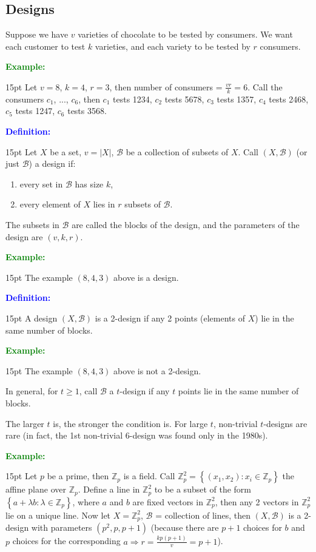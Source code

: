 \documentclass[12pt]{article}
\newcommand{\noparskip}{\vspace{-\parskip}}
\newenvironment{points}
	{\begin{enumerate}[label = (\arabic*)]}
	{\end{enumerate}}
\newenvironment{dent}
	{\begin{adjustwidth}{15pt}{}\noparskip}
	{\end{adjustwidth}}
\newenvironment{definition}
	{\textcolor{Blue}{\textbf{Definition:}}\begin{dent}}
	{\end{dent}}
\newenvironment{example}
	{\textcolor{Green}{\textbf{Example:}}\begin{dent}}
	{\end{dent}}
\renewcommand{\implies}{\Rightarrow}
\newcommand{\set}[1]{\left\{ #1 \right\}}
\newcommand{\sizeof}[1]{\left| #1 \right|}
\newcommand{\Z}{\mathbb{Z}}
\newcommand{\cB}{\mathcal{B}}
\begin{document}
\subsection{Designs}

Suppose we have $v$ varieties of chocolate to be tested by consumers. We want each customer to test $k$ varieties, and each variety to be tested by $r$ consumers.

\begin{example}
Let $v = 8$, $k = 4$, $r = 3$, then number of consumers = $\frac{vr}{k} = 6$. Call the consumers $c_1$, ..., $c_6$, then $c_1$ tests 1234, $c_2$ tests 5678, $c_3$ tests 1357, $c_4$ tests 2468, $c_5$ tests 1247, $c_6$ tests 3568.
\end{example}

\begin{definition}
Let $X$ be a set, $v = \sizeof{X}$, $\cB$ be a collection of subsets of $X$. Call $(X, \cB)$ (or just $\cB$) a design if:
\noparskip
\begin{points}
\item every set in $\cB$ has size $k$,
\item every element of $X$ lies in $r$ subsets of $\cB$.
\end{points}
\end{definition}

The subsets in $\cB$ are called the blocks of the design, and the parameters of the design are $(v, k, r)$.

\begin{example}
The example $(8, 4, 3)$ above is a design.
\end{example}

\begin{definition}
A design $(X, \cB)$ is a 2-design if any 2 points (elements of $X$) lie in the same number of blocks.
\end{definition}

\begin{example}
The example $(8, 4, 3)$ above is not a 2-design.
\end{example}

In general, for $t \ge 1$, call $\cB$ a $t$-design if any $t$ points lie in the same number of blocks.

The larger $t$ is, the stronger the condition is. For large $t$, non-trivial $t$-designs are rare (in fact, the 1st non-trivial 6-design was found only in the 1980s).

\begin{example}
Let $p$ be a prime, then $\Z_p$ is a field. Call $\Z_p^2 = \set{(x_1, x_2): x_i \in \Z_p}$ the affine plane over $\Z_p$. Define a line in $\Z_p^2$ to be a subset of the form $\set{a + \lambda b: \lambda \in \Z_p}$, where $a$ and $b$ are fixed vectors in $\Z_p^2$, then any 2 vectors in $\Z_p^2$ lie on a unique line. Now let $X = \Z_p^2$, $\cB$ = collection of lines, then $(X, \cB)$ is a 2-design with parameters $(p^2, p, p + 1)$ (because there are $p + 1$ choices for $b$ and $p$ choices for the corresponding $a\implies r = \frac{kp (p + 1)}{v} = p + 1$).
\end{example}
\end{document}
